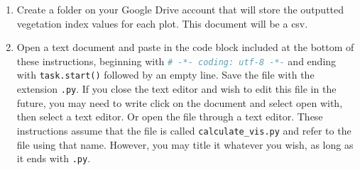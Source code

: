 \documentclass{article}
\begin{document}
\begin{enumerate}
  \item Create a folder on your Google Drive account that will store the outputted vegetation index values for each plot. This document will be a csv. 

  \item Open a text document and paste in the code block included at the bottom of these instructions, beginning with \lstinline[language=Python]{# -*- coding: utf-8 -*-} and ending with \lstinline[language=Python]{task.start()} followed by an empty line. Save the file with the extension \lstinline[language=Python]{.py}. If you close the text editor and wish to edit this file in the future, you may need to write click on the document and select open with, then select a text editor. Or open the file through a text editor. These instructions assume that the file is called \lstinline[language=Python]{calculate_vis.py} and refer to the file using that name. However, you may title it whatever you wish, as long as it ends with \lstinline[language=Python]{.py}.


\end{enumerate}
\end{document}
